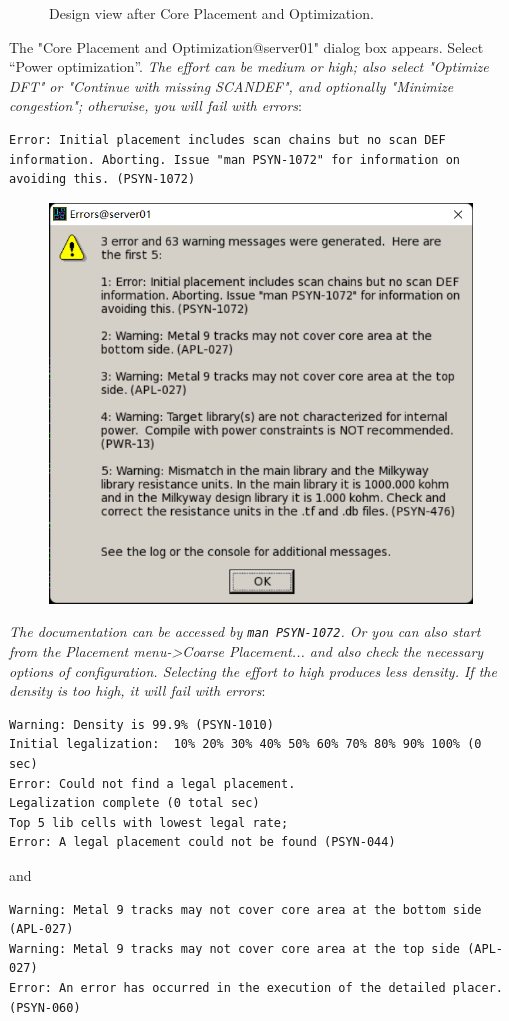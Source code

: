 \documentclass[a4paper,12pt,twoside]{article}
\begin{document}
\begin{enumerate}
\begin{enumerate}
\begin{figure}[H]
            \caption{Design view after Core Placement and Optimization.}
            \label{f17}
        \end{figure}
        The "Core Placement and Optimization@server01" dialog box appears. Select “Power optimization”. \textit{The effort can be medium or high; also select "Optimize DFT" or "Continue with missing SCANDEF", and optionally "Minimize congestion"; otherwise, you will fail with errors}:
        \begin{verbatim}
Error: Initial placement includes scan chains but no scan DEF information. Aborting. Issue "man PSYN-1072" for information on avoiding this. (PSYN-1072)
        \end{verbatim}
        \begin{figure}[H]
            \centering
            \includegraphics[width=\textwidth]{images/16.png}
        \end{figure}
        \textit{The documentation can be accessed by \texttt{man PSYN-1072}. Or you can also start from the Placement menu->Coarse Placement... and also check the necessary options of configuration. Selecting the effort to high produces less density. If the density is too high, it will fail with errors}:
        \begin{verbatim}
Warning: Density is 99.9% (PSYN-1010)
Initial legalization:  10% 20% 30% 40% 50% 60% 70% 80% 90% 100% (0 sec)
Error: Could not find a legal placement.
Legalization complete (0 total sec)
Top 5 lib cells with lowest legal rate;
Error: A legal placement could not be found (PSYN-044)
        \end{verbatim}
        and
        \begin{verbatim}
Warning: Metal 9 tracks may not cover core area at the bottom side (APL-027)
Warning: Metal 9 tracks may not cover core area at the top side (APL-027)
Error: An error has occurred in the execution of the detailed placer. (PSYN-060)


\end{verbatim}
\end{enumerate}
\end{enumerate}
\end{document}
